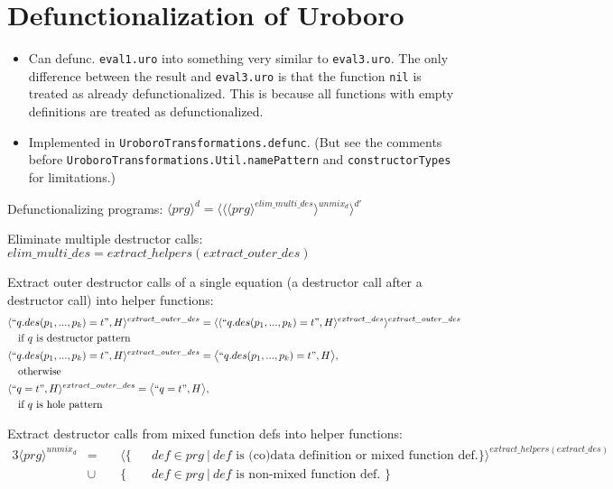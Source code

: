 \documentclass[11pt]{article} %
\begin{document}
\section{Defunctionalization of Uroboro}

\begin{itemize}
\item Can defunc. \texttt{eval1.uro} into something very similar to \texttt{eval3.uro}. The only difference between the result and \texttt{eval3.uro} is that the function \texttt{nil} is treated as already defunctionalized. This is because all functions with empty definitions are treated as defunctionalized.

\item Implemented in \texttt{UroboroTransformations.defunc}. (But see the comments before \texttt{UroboroTransformations.Util.namePattern} and \texttt{constructorTypes} for limitations.)

\end{itemize}

Defunctionalizing programs: $\langle prg \rangle^d = \langle \langle \langle prg \rangle^{elim\_multi\_des} \rangle^{unmix_d} \rangle^{d'}$

Eliminate multiple destructor calls: $elim\_multi\_des = extract\_helpers(extract\_outer\_des)$

Extract outer destructor calls of a single equation (a destructor call after a destructor call) into helper functions:
\begin{alignat*}{2}
& \langle `` q.des(p_1, ..., p_k) = t ", H \rangle^{extract\_outer\_des} = \langle \langle `` q.des(p_1, ..., p_k) = t ", H \rangle^{extract\_des} \rangle^{extract\_outer\_des} \\
&\quad \textrm{if $q$ is destructor pattern } \\
& \langle `` q.des(p_1, ..., p_k) = t ", H \rangle^{extract\_outer\_des} = \big\langle `` q.des(p_1, ..., p_k) = t ", H \big\rangle, \\
&\quad \textrm{otherwise} \\
& \langle `` q = t ", H \rangle^{extract\_outer\_des} = \big\langle `` q = t ", H \big\rangle, \\
&\quad \textrm{if $q$ is hole pattern}
\end{alignat*}

Extract destructor calls from mixed function defs into helper functions:
\begin{alignat*}{3}
\langle prg \rangle^{unmix_d} & = ~&& \langle \{ && def \in prg ~ | ~ def \textrm{ is (co)data definition or mixed function def.} \} \rangle^{extract\_helpers(extract\_des)} \\
&\cup && \{ && def \in prg ~ | ~ def \textrm{ is non-mixed function def. } \}
\end{alignat*}
\end{document}
